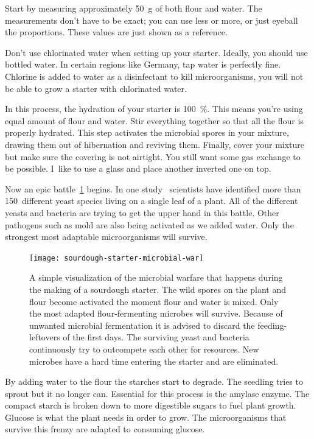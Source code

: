 Start by measuring approximately \qty{50}{\gram} of both flour and
water. The measurements don't have to be exact; you can use
less or more, or just eyeball the proportions. These
values are just shown as a reference.

Don't use chlorinated water when setting up your starter.
Ideally, you should use bottled water. In certain regions
like Germany, tap water is perfectly fine. Chlorine is added
to water as a disinfectant to kill microorganisms, you will
not be able to grow a starter with chlorinated water.

In this process, the hydration of your starter is \qty{100}{\percent}.
This means you're using equal amount of flour and
water. Stir everything together so that all the flour is
properly hydrated. This step activates the microbial spores
in your mixture, drawing them out of hibernation and
reviving them.
Finally, cover your mixture but make sure the covering is
not airtight. You still want some gas exchange to be possible.
I~like to use a glass and place another
inverted one on top.

Now an epic battle~\ref{fig:sourdough-starter-microbial-war} begins. In one study~\cite{yeasts+biocontrol+agent}
scientists have identified more than \num{150}~different yeast species living
on a single leaf of a plant.
All of the different yeasts and bacteria are trying to get
the upper hand in this battle. Other pathogens such as mold
are also being activated as we added water. Only the strongest
most adaptable microorganisms will survive.

\begin{figure}[!htb]
  \texttt{[image: sourdough-starter-microbial-war]}
  \caption[Microbial warfare during sourdough early days]{A simple
      visualization of the microbial warfare that happens during the making of
      a sourdough starter. The wild spores on the plant and flour become
      activated the moment flour and water is mixed.  Only the most adapted
      flour-fermenting microbes will survive. Because of unwanted microbial
      fermentation it is advised to discard the feeding-leftovers of the first
      days. The surviving yeast and bacteria continuously try to outcompete
      each other for resources. New microbes have a hard time entering the
      starter and are eliminated.}%
  \label{fig:sourdough-starter-microbial-war}
\end{figure}

By adding water to the
flour the starches start to degrade. The seedling tries to
sprout but it no longer can. Essential for this process is the
amylase enzyme. The compact starch is broken down to more
digestible sugars to fuel plant growth. Glucose is what the
plant needs in order to grow. The microorganisms that survive
this frenzy are adapted to consuming glucose. 


